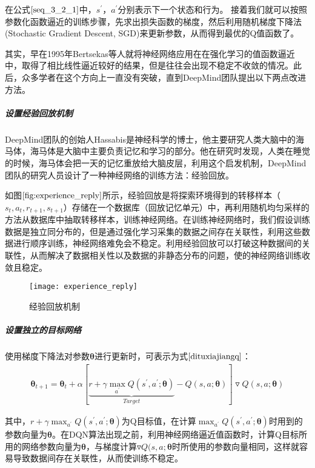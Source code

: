 在公式$\eqref{seq_3_2_1}$中，$s^{'}$，$a^{'}$分别表示下一个状态和行为。
接着我们就可以按照参数化函数逼近的训练步骤，先求出损失函数的梯度，然后利用随机梯度下降法(Stochastic Gradient Descent, SGD)来更新参数，从而得到最优的Q值函数了。

其实，早在1995年Bertsekas等人就将神经网络应用在在强化学习的值函数逼近中，取得了相比线性逼近较好的结果，但是往往会出现不稳定不收敛的情况\citep{bertsekas1995neuro}。此后，众多学者在这个方向上一直没有突破，直到DeepMind团队提出以下两点改进方法。

 \subparagraph{设置经验回放机制}
DeepMind团队的创始人Hassabis是神经科学的博士，他主要研究人类大脑中的海马体，海马体是大脑中主要负责记忆和学习的部分。他在研究时发现，人类在睡觉的时候，海马体会把一天的记忆重放给大脑皮层，利用这个启发机制，DeepMind团队的研究人员设计了一种神经网络的训练方法：经验回放。

如图$\ref{fig:experience_reply}$所示，经验回放是将探索环境得到的转移样本（$s_{t}, a_{t}, r_{t+1}, s_{t+1}$）存储在一个数据库（回放记忆单元）中，再利用随机均匀采样的方法从数据库中抽取转移样本，训练神经网络。在训练神经网络时，我们假设训练数据是独立同分布的，但是通过强化学习采集的数据之间存在关联性，利用这些数据进行顺序训练，神经网络难免会不稳定。利用经验回放可以打破这种数据间的关联性，从而解决了数据相关性以及数据的非静态分布的问题，使的神经网络训练收敛且稳定。
\begin{figure}[htbp]
\centering
\texttt{[image: experience\_reply]}
\caption{经验回放机制}
\label{fig:experience_reply}
\end{figure}

 \subparagraph{设置独立的目标网络}
使用梯度下降法对参数$\bm{\theta}$进行更新时，可表示为式$\eqref{dituxiajiangq}$：
\begin{equation}\label{dituxiajiangq}
\begin{aligned}
\bm{\theta}_{t+1}=\bm{\theta}_{t}+\alpha[\underbrace{r+\gamma \max_{a^{'}}Q(s^{'},a^{'};\bm{\theta})}_{Target}-Q(s,a;\bm{\theta})]\triangledown Q(s,a;\bm{\theta})
\end{aligned}
\end{equation}

其中，$r+\gamma \max_{a^{'}}Q(s^{'},a^{'};\bm{\theta})$为Q目标值，在计算$\max_{a^{'}}Q(s^{'},a^{'};\bm{\theta})$时用到的参数向量为$\bm{\theta}$。在DQN算法出现之前，利用神经网络逼近值函数时，计算Q目标所用的网络参数向量为$\bm{\theta}$，与梯度计算$\triangledown Q(s,a;\bm{\theta}$时所使用的参数向量相同，这样就容易导致数据间存在关联性，从而使训练不稳定。

